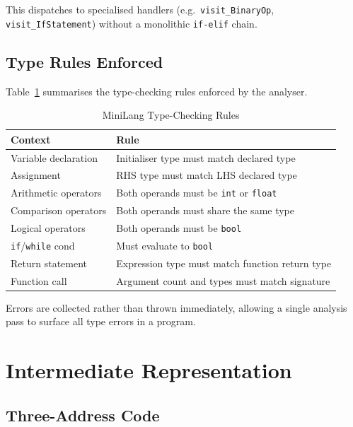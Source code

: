 \documentclass[conference]{IEEEtran}
\begin{document}
This dispatches to specialised handlers (e.g.\
\texttt{visit\_BinaryOp}, \texttt{visit\_IfStatement}) without a
monolithic \texttt{if-elif} chain.

\subsection{Type Rules Enforced}

Table~\ref{tab:typerules} summarises the type-checking rules enforced
by the analyser.

\begin{table}[htbp]
\caption{MiniLang Type-Checking Rules}
\label{tab:typerules}
\centering
\renewcommand{\arraystretch}{1.2}
\begin{tabular}{@{}p{3.5cm}p{4.3cm}@{}}
\toprule
\textbf{Context} & \textbf{Rule} \\
\midrule
Variable declaration          & Initialiser type must match declared type \\
Assignment                    & RHS type must match LHS declared type \\
Arithmetic operators          & Both operands must be \texttt{int} or \texttt{float} \\
Comparison operators          & Both operands must share the same type \\
Logical operators             & Both operands must be \texttt{bool} \\
\texttt{if}/\texttt{while} cond & Must evaluate to \texttt{bool} \\
Return statement              & Expression type must match function return type \\
Function call                 & Argument count and types must match signature \\
\bottomrule
\end{tabular}
\end{table}

Errors are collected rather than thrown immediately, allowing a single
analysis pass to surface all type errors in a program.

\section{Intermediate Representation}
\label{sec:ir}

\subsection{Three-Address Code}
\end{document}
